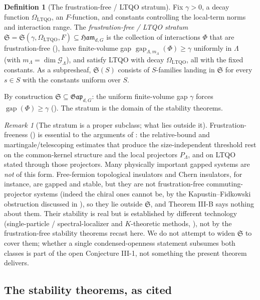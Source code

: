 \documentclass[12pt]{article}
\newcommand{\Ffun}{F}                          %
\newcommand{\Ham}{\mathfrak{Ham}}              %
\newcommand{\Gap}{\mathfrak{Gap}}              %
\newcommand{\gapof}[1]{\operatorname{gap}(#1)} %
\newcommand{\gsp}{\mathcal{G}}                 %
\newcommand{\gapfin}[1]{\operatorname{gap}_{#1}}
\theoremstyle{plain}
\theoremstyle{definition}
\newtheorem{definition}[definition]{Definition}
\theoremstyle{remark}
\newtheorem{remark}[remark]{Remark}
\begin{document}
\begin{definition}[The frustration-free / LTQO stratum]
\label{def:stratum}
Fix $\gamma>0$, a decay function $\Omega_{\mathrm{LTQO}}$, an $\Ffun$-function, and
constants controlling the local-term norms and interaction range. The
\emph{frustration-free / LTQO stratum}
$\mathfrak{S}=\mathfrak{S}(\gamma,\Omega_{\mathrm{LTQO}},\Ffun)\subseteq\Ham_{d,G}$
is the collection of interactions $\Phi$ that are frustration-free
(), have finite-volume gap $\gapfin{\Lambda,m_\Lambda}(\Phi)\ge\gamma$
uniformly in $\Lambda$ (with $m_\Lambda=\dim\gsp_\Lambda$), and satisfy LTQO with
decay $\Omega_{\mathrm{LTQO}}$, all with the fixed constants. As a subpresheaf,
$\mathfrak{S}(S)$ consists of $S$-families landing in $\mathfrak{S}$ for every $s\in S$
with the constants uniform over $S$.
\end{definition}

By construction $\mathfrak{S}\subseteq\Gap_{d,G}$: the uniform finite-volume gap
$\gamma$ forces $\gapof{\Phi}\ge\gamma$ (). The stratum is the
domain of the stability theorems.

\begin{remark}[The stratum is a proper subclass; what lies outside it]
\label{rem:stratum-boundary}
Frustration-freeness () is essential to the arguments of
: the relative-bound and martingale/telescoping
estimates that produce the size-independent threshold rest on the common-kernel
structure and the local projectors $P_\Lambda$, and on LTQO stated through those
projectors. Many physically important gapped systems are \emph{not} of this form.
Free-fermion topological insulators and Chern insulators, for instance, are gapped
and stable, but they are not frustration-free commuting-projector systems (indeed
the chiral ones cannot be, by the Kapustin--Fidkowski obstruction \cite{kapustin-fidkowski} discussed in
), so they lie outside $\mathfrak{S}$, and Theorem III-B says
nothing about them. Their stability is real but is established by different
technology (single-particle / spectral-localizer and $K$-theoretic methods,
\cite{prodan-sb}), not by the frustration-free stability theorems recast here. We do
not attempt to widen $\mathfrak{S}$ to cover them; whether a single condensed-openness
statement subsumes both classes is part of the open Conjecture III-1, not something
the present theorem delivers.
\end{remark}

\subsection{The stability theorems, as cited}
\label{sec:stability-cited}
\end{document}
